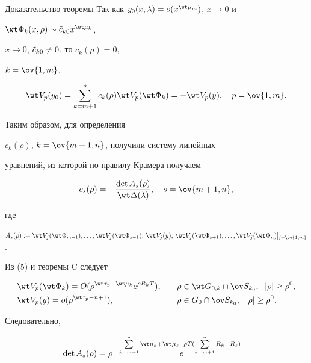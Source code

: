 \begin{pf*}{Доказательство теоремы}
Так как $y_0(x,\lambda)=o(x^{\wt\mu_m})$, $x\to 0$ и


$\wt\Phi_k(x,\rho)\sim\Tilde c_{k0}x^{\wt\mu_k}$,


$x\to 0$, $\Tilde c_{k0}\ne 0$, то $c_k(\rho)=0$,


$k=\ov{1,m}$.


$$


\wt V_p(y_0)=\sum^n_{k=m+1}c_k(\rho)\wt V_p(\wt\Phi_k)=


-\wt V_p(y),\quad p=\ov{1,m}.


$$


Таким образом, для определения


$c_k(\rho)$, $k=\ov{m+1,n}$, получили систему линейных


уравнений, из которой по правилу Крамера получаем


$$


c_s(\rho)=-\frac{\det A_s(\rho)}{\wt\Delta(\lambda)},\quad


s=\ov{m+1,n},


$$


где


$A_s(\rho):=\wt V_j(\wt\Phi_{m+1}),\dotsc,\wt V_j(\wt\Phi_{s-1}),


\,\wt V_j(y),\,\wt V_j(\wt\Phi_{s+1}),\dotsc,


\wt V_j(\wt\Phi_n)]_{j=\ov{1,m}}$.





Из (5) и теоремы C следует


\begin{alignat*}{2}


& \wt V_p(\wt\Phi_k)=O(\rho^{\wt\tau_p-\wt\mu_k}


e^{\rho R_kT}),&\quad & \rho\in\wt G_{0,k}\cap\ov S_{k_0}, \ \;


|\rho|\ge\rho^0,\\


& \wt V_p(y)=o(\rho^{\wt\tau_p-n+1}), &\quad


& \rho\in G_0\cap \ov S_{k_0}, \ \; |\rho|\ge\rho^0.


\end{alignat*}


Следовательно,


\begin{align*}


\det A_s(\rho)&=


\rho^{-\suml^n_{k=m+1}\wt\mu_k+\wt\mu_s}


e^{\rho T(\suml^n_{k=m+1}R_k-R_s)}



\end{align*}
\end{pf*}
